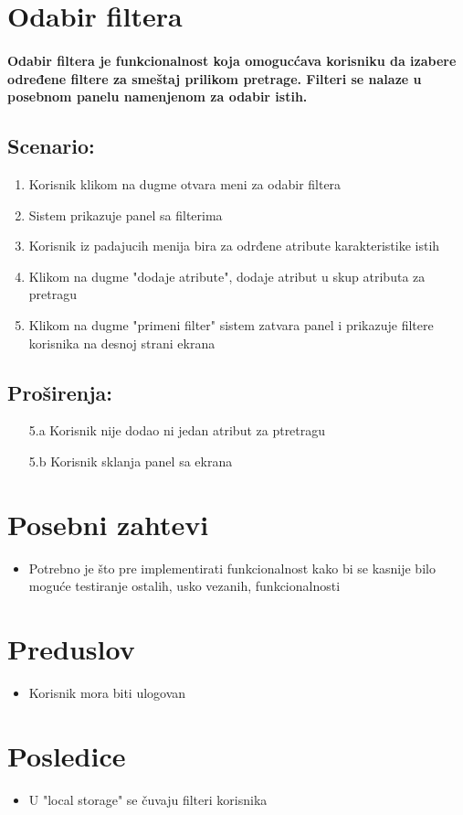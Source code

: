 \section{Odabir filtera}
\paragraph{Odabir filtera je funkcionalnost koja omogucćava korisniku da izabere određene filtere za smeštaj prilikom pretrage. Filteri se nalaze u posebnom panelu namenjenom za odabir istih.}

\subsection{\textbf{Scenario:}}
\begin{enumerate}
    \item Korisnik klikom na dugme otvara meni za odabir filtera
    \item Sistem prikazuje panel sa filterima
    \item Korisnik iz padajucih menija bira za odrđene atribute karakteristike istih
    \item Klikom na dugme "dodaje atribute", dodaje atribut u skup atributa za pretragu
    \item Klikom na dugme "primeni filter" sistem zatvara panel i prikazuje filtere korisnika na desnoj strani ekrana
\end{enumerate}
\newpage
\subsection{\textbf{Proširenja:}}

\begin{enumerate}
\color{Maroon}
  \item[5.a] Korisnik nije dodao ni jedan atribut za ptretragu
  \item[5.b]Korisnik sklanja panel sa ekrana
\end{enumerate}
\section{Posebni zahtevi}
\begin{itemize}
    \item Potrebno je što pre implementirati funkcionalnost kako bi se kasnije bilo moguće testiranje ostalih, usko vezanih, funkcionalnosti
\end{itemize}
\section{Preduslov}
\begin{itemize}
    \item Korisnik mora biti ulogovan
\end{itemize}

\section{Posledice}
\begin{itemize}
    \item U "local storage" se čuvaju filteri korisnika
\end{itemize}
